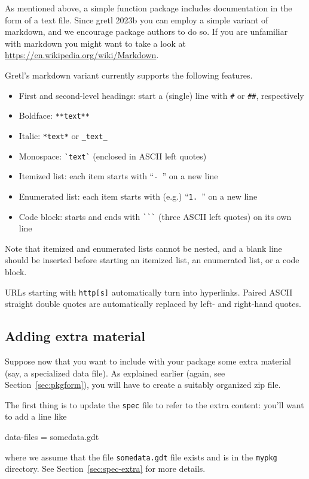 \documentclass[oneside]{book}
\begin{document}
As mentioned above, a simple function package includes documentation
in the form of a text file. Since gretl 2023b you can employ a simple
variant of markdown, and we encourage package authors to do so. If you
are unfamiliar with markdown you might want to take a look at
\url{https://en.wikipedia.org/wiki/Markdown}.

Gretl's markdown variant currently supports the following features.

\begin{itemize}
\item First and second-level headings: start a (single) line with
  \verb|#| or \verb|##|, respectively
\item Boldface: \verb|**text**|
\item Italic: \verb|*text*| or \verb|_text_|
\item Monospace: \verb|`text`| (enclosed in ASCII left quotes)
\item Itemized list: each item starts with ``\verb|- |'' on a new line
\item Enumerated list: each item starts with (e.g.) ``\verb|1. |''
  on a new line
\item Code block: starts and ends with \verb|```| (three ASCII left
  quotes) on its own line
\end{itemize}

Note that itemized and enumerated lists cannot be nested, and a blank
line should be inserted before starting an itemized list, an
enumerated list, or a code block.

URLs starting with \texttt{http[s]} automatically turn into
hyperlinks.  Paired ASCII straight double quotes are automatically
replaced by left- and right-hand quotes.

\subsection{Adding extra material}

Suppose now that you want to include with your package some extra
material (say, a specialized data file). As explained earlier (again,
see Section~\ref{sec:pkgform}), you will have to create a suitably
organized zip file.

The first thing is to update the \texttt{spec} file to refer to the
extra content: you'll want to add a line like
\begin{code}
data-files = somedata.gdt
\end{code}
where we assume that the file \texttt{somedata.gdt} file exists and is
in the \texttt{mypkg} directory. See Section~\ref{sec:spec-extra} for
more details.
\end{document}
